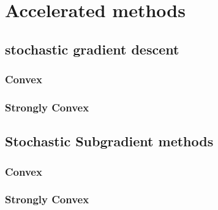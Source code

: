 \section{Accelerated methods}
\subsection{stochastic gradient descent}
\subsubsection{Convex}
\subsubsection{Strongly Convex}


\subsection{Stochastic Subgradient methods}

\subsubsection{Convex}

\subsubsection{Strongly Convex}









